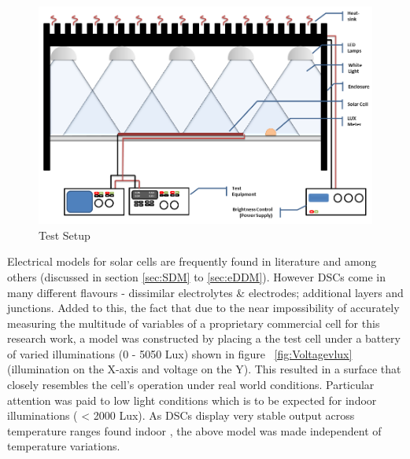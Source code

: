  \begin{figure}[H]
	  \begin{center}
		  \includegraphics[width=\textwidth]{images/Light_Box}
		  \caption{Test Setup }
		  \label{fig:test setup}
	  \end{center}
  \end{figure}
  

Electrical models for solar cells are frequently found in literature \cite{vignati2012solutions} and \cite{yong2008modeling} among others (discussed in section \ref{sec:SDM} to \ref{sec:eDDM}). However \ac{DSCs} come in many different flavours - dissimilar electrolytes \& electrodes; additional layers and junctions. Added to this, the fact that due to the near impossibility of accurately measuring the multitude of variables of a proprietary commercial cell for this research work, a model was constructed by placing a the test cell under a battery of varied illuminations (0 - 5050 Lux) shown in figure ~\ref{fig:Voltagevlux} (illumination on the X-axis and voltage on the Y). This resulted in a surface that closely resembles the cell's operation under real world conditions. Particular attention was paid to low light conditions which is to be expected for indoor illuminations ( < 2000 Lux). As \ac{DSCs} display very stable output across temperature ranges found indoor \cite{lee2010high}, the above model was made independent of temperature variations.

